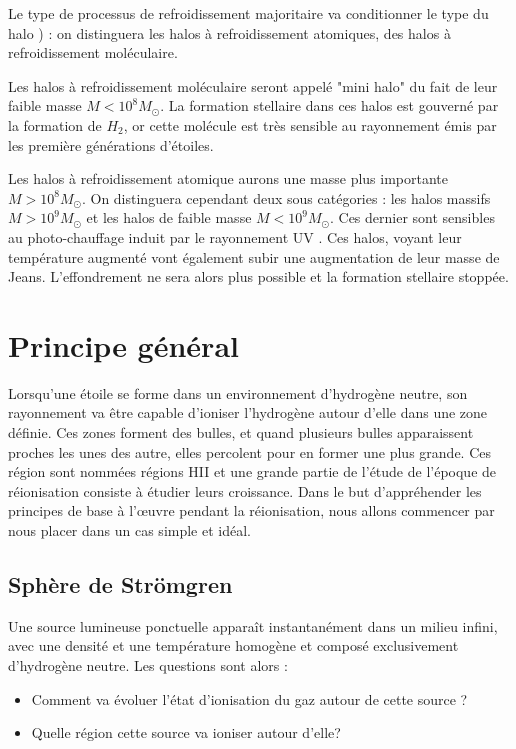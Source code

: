 Le type de processus de refroidissement majoritaire va conditionner le type du halo \citep{2002Sci...295...93A}) : on distinguera les halos à refroidissement atomiques, des halos à refroidissement moléculaire.

Les halos à refroidissement moléculaire seront appelé "mini halo" du fait de leur faible masse $M < 10^8 M_\odot$.
La formation stellaire dans ces halos est gouverné par la formation de $H_2$, or cette molécule est très sensible au rayonnement émis par les première générations d'étoiles.

Les halos à refroidissement atomique aurons une masse plus importante $M > 10^8 M_\odot$.
On distinguera cependant deux sous catégories : les halos massifs $M > 10^9 M_\odot$ et les halos de faible masse $M< 10^9 M_\odot$.
Ces dernier sont sensibles au photo-chauffage induit par le rayonnement UV \citep{1998ApJ...497...21M}.
Ces halos, voyant leur température augmenté vont également subir une augmentation de leur masse de Jeans.
L'effondrement ne sera alors plus possible et la formation stellaire stoppée.




\clearpage
\section{Principe général}

Lorsqu'une étoile se forme dans un environnement d'hydrogène neutre, son rayonnement va être capable d'ioniser l'hydrogène autour d'elle dans une zone définie.
Ces zones forment des bulles, et quand plusieurs bulles apparaissent proches les unes des autre, elles percolent pour en former une plus grande.
Ces région sont nommées régions HII et une grande partie de l'étude de l'époque de réionisation consiste à étudier leurs croissance.
Dans le but d’appréhender les principes de base à l’œuvre pendant la réionisation, nous allons commencer par nous placer dans un cas simple et idéal.

\subsection{Sphère de Strömgren}
\label{sec:stromgren}

Une source lumineuse ponctuelle apparaît instantanément dans un milieu infini, avec une densité et une température homogène et composé exclusivement d’hydrogène neutre.
Les questions sont alors : 
\begin{itemize}
\item Comment va évoluer l’état d'ionisation du gaz autour de cette source ?
\item Quelle région cette source va ioniser autour d'elle?
\end{itemize}


